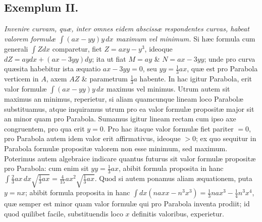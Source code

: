 \subsection*{Exemplum II.}
\textit{Invenire curvam, quæ, inter omnes eidem abscissæ respondentes curvas, habeat valorem formulæ $\int(ax-yy)y\,dx$ maximum vel minimum.}
Si hæc formula cum generali $\int Zdx$ comparetur, fiet $Z=axy-y^3$, ideoque $dZ=aydx+(ax-3yy)dy$; ita ut fiat $M=ay$ \& $N=ax-3yy$; unde pro curva quæsita habebitur ista æquatio $ax-3yy=0$, seu $yy=\frac13ax$, quæ est pro Parabola verticem in $A$, axem $AZ$ \& parametrum $\frac13a$ habente. In hac igitur Parabola, erit valor formulæ $\int(ax-yy)y\,dx$ maximus vel minimus. Utrum autem sit maximus an minimus, reperietur, si aliam quamcunque lineam loco Parabolæ substituamus, atque inquiramus utrum pro ea valor formulæ propositæ major sit an minor quam pro Parabola. Sumamus igitur lineam rectam cum ipso axe congruentem, pro qua erit $y=0$. Pro hac itaque valor formulæ fiet pariter $=0$, pro Parabola autem idem valor erit affirmativus, ideoque $>0$; ex quo sequitur in Parabola formulæ propositæ valorem non esse minimum, sed maximum. Poterimus autem algebraice indicare quantus futurus sit valor formulæ propositæ pro Parabola: cum enim sit $yy=\frac13ax$, abibit formula proposita in hanc $\int\frac23ax\,dx\sqrt{\frac13ax}=\frac4{15}ax^2\sqrt{\frac13ax}$. Quod si autem ponamus aliam æquationem, puta $y=nx$; abibit formula proposita in hanc $\int dx(naxx-n^3x^3)=\frac13nax^3-\frac14n^3x^4$, quæ semper est minor quam valor formulæ qui pro Parabola inventa prodiit; id quod quilibet facile, substituendis loco $x$ definitis valoribus, experietur.

